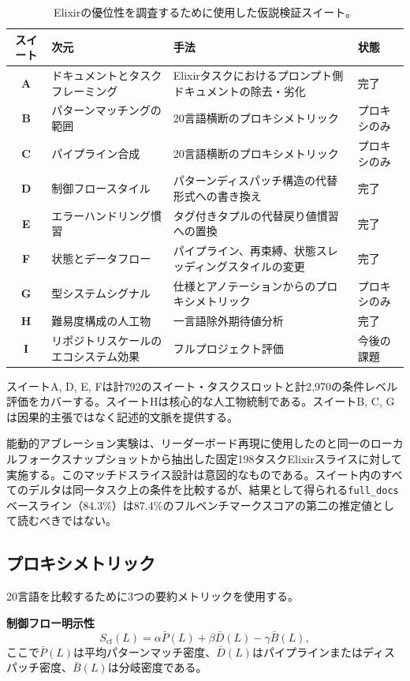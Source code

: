 \documentclass[11pt]{article}
\newcommand{\elixir}{Elixir}
\newcommand{\cfscore}{S_{\mathrm{cf}}}
\begin{document}
\begin{table}[H]
\centering
\caption{\elixir{}の優位性を調査するために使用した仮説検証スイート。}
\label{tab:suites}
\small
\begin{tabularx}{\textwidth}{>{\bfseries}c l X l}
\toprule
スイート & 次元 & 手法 & 状態 \\
\midrule
A & ドキュメントとタスクフレーミング & \elixir{}タスクにおけるプロンプト側ドキュメントの除去・劣化 & 完了 \\
B & パターンマッチングの範囲 & 20言語横断のプロキシメトリック & プロキシのみ \\
C & パイプライン合成 & 20言語横断のプロキシメトリック & プロキシのみ \\
D & 制御フロースタイル & パターンディスパッチ構造の代替形式への書き換え & 完了 \\
E & エラーハンドリング慣習 & タグ付きタプルの代替戻り値慣習への置換 & 完了 \\
F & 状態とデータフロー & パイプライン、再束縛、状態スレッディングスタイルの変更 & 完了 \\
G & 型システムシグナル & 仕様とアノテーションからのプロキシメトリック & プロキシのみ \\
H & 難易度構成の人工物 & 一言語除外期待値分析 & 完了 \\
I & リポジトリスケールのエコシステム効果 & フルプロジェクト評価 & 今後の課題 \\
\bottomrule
\end{tabularx}
\end{table}

スイートA, D, E, Fは計792のスイート・タスクスロットと計2{,}970の条件レベル評価をカバーする。スイートHは核心的な人工物統制である。スイートB, C, Gは因果的主張ではなく記述的文脈を提供する。

能動的アブレーション実験は、リーダーボード再現に使用したのと同一のローカルフォークスナップショットから抽出した固定198タスクElixirスライスに対して実施する。このマッチドスライス設計は意図的なものである。スイート内のすべてのデルタは同一タスク上の条件を比較するが、結果として得られる\texttt{full\_docs}ベースライン（84.3\%）は87.4\%のフルベンチマークスコアの第二の推定値として読むべきではない。

\subsection{プロキシメトリック}

20言語を比較するために3つの要約メトリックを使用する。

\textbf{制御フロー明示性}
\begin{equation}
\cfscore(L) = \alpha \bar{P}(L) + \beta \bar{D}(L) - \gamma \bar{B}(L),
\label{eq:cf}
\end{equation}
ここで$\bar{P}(L)$は平均パターンマッチ密度、$\bar{D}(L)$はパイプラインまたはディスパッチ密度、$\bar{B}(L)$は分岐密度である。
\end{document}
